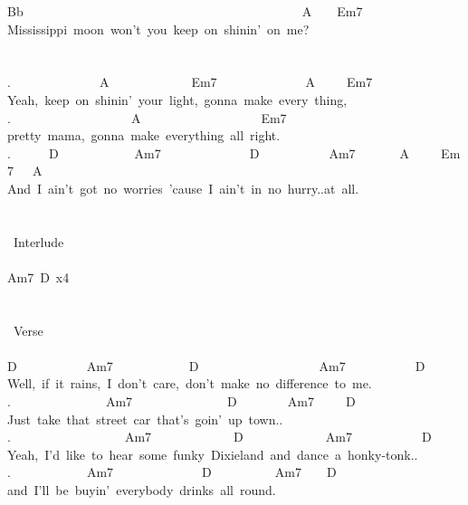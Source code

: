 {Bb\ \ \ \ \ \ \ \ \ \ \ \ \ \ \ \ \ \ \ \ \ \ \ \ \ \ \ \ \ \ \ \ \ \ \ \ \ \ \ \ \ \ \ \ A\ \ \ \ Em7\ \\
Mississippi\ moon\ won't\ you\ keep\ on\ shinin'\ on\ me?\\
\\
\ \ \ \ \ \\
.\ \ \ \ \ \ \ \ \ \ \ \ \ \ A\ \ \ \ \ \ \ \ \ \ \ \ \ Em7\ \ \ \ \ \ \ \ \ \ \ \ \ \ A\ \ \ \ \ Em7\ \ \\
Yeah,\ keep\ on\ shinin'\ your\ light,\ gonna\ make\ every\ thing,\\
.\ \ \ \ \ \ \ \ \ \ \ \ \ \ \ \ \ \ \ A\ \ \ \ \ \ \ \ \ \ \ \ \ \ \ \ \ \ \ Em7\\
pretty\ mama,\ gonna\ make\ everything\ all\ right.\\
.\ \ \ \ \ \ D\ \ \ \ \ \ \ \ \ \ \ \ Am7\ \ \ \ \ \ \ \ \ \ \ \ \ \ D\ \ \ \ \ \ \ \ \ \ \ Am7\ \ \ \ \ \ \ A\ \ \ \ \ Em7\ \ \ A\\
And\ I\ ain't\ got\ no\ worries\ 'cause\ I\ ain't\ in\ no\ hurry..at\ all.\\
\\
\\
\lbrack\ Interlude\rbrack\\
\ \ \ \\
Am7\ D\ x4\\
\\
\\
\lbrack\ Verse\rbrack\\
\\
D\ \ \ \ \ \ \ \ \ \ \ Am7\ \ \ \ \ \ \ \ \ \ \ \ D\ \ \ \ \ \ \ \ \ \ \ \ \ \ \ \ \ \ \ Am7\ \ \ \ \ \ \ \ \ \ \ D\ \\
Well,\ if\ it\ rains,\ I\ don't\ care,\ don't\ make\ no\ difference\ to\ me.\\
.\ \ \ \ \ \ \ \ \ \ \ \ \ \ \ Am7\ \ \ \ \ \ \ \ \ \ \ \ \ \ \ D\ \ \ \ \ \ \ \ Am7\ \ \ \ \ D\\
Just\ take\ that\ street\ car\ that's\ goin'\ up\ town..\\
.\ \ \ \ \ \ \ \ \ \ \ \ \ \ \ \ \ \ Am7\ \ \ \ \ \ \ \ \ \ \ \ \ D\ \ \ \ \ \ \ \ \ \ \ \ \ Am7\ \ \ \ \ \ \ \ \ \ \ D\ \\
Yeah,\ I'd\ like\ to\ hear\ some\ funky\ Dixieland\ and\ dance\ a\ honky-tonk..\\
.\ \ \ \ \ \ \ \ \ \ \ \ Am7\ \ \ \ \ \ \ \ \ \ \ \ \ \ D\ \ \ \ \ \ \ \ \ \ Am7\ \ \ \ D\ \\
and\ I'll\ be\ buyin'\ everybody\ drinks\ all\ round.\\
\\
}
